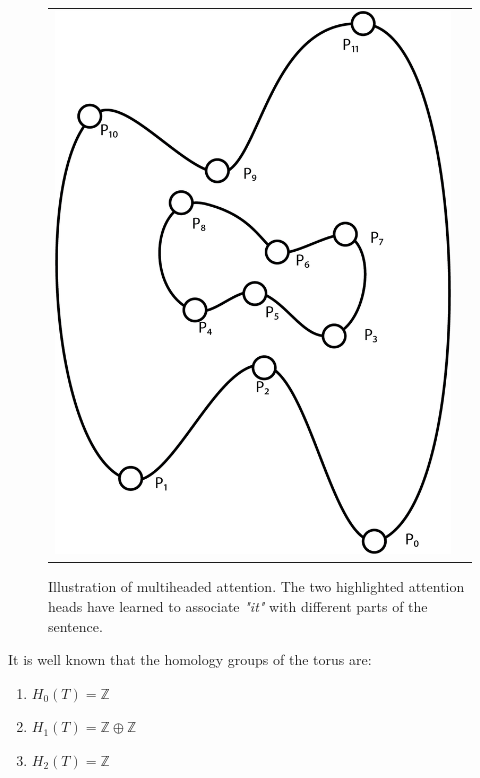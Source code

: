 \documentclass[a4paper]{article}
\theoremstyle{theorem}
\theoremstyle{definition}
\theoremstyle{remark}
\theoremstyle{gremark}
\theoremstyle{discussion}
\theoremstyle{notation}
\begin{document}
	\begin{figure}
	\vspace{-1.75\baselineskip}
	\begin{tabularx}{\linewidth}{@{} cX @{}}
		\includegraphics[scale=0.41,valign=T]{example_figure_1.png}
		&
		\caption[Illustration of multiheaded attention]
		{Illustration of multiheaded attention. The two highlighted attention heads have learned to associate \textit{"it"} with different parts of the sentence.}
		\label{fig:transformer3}
	\end{tabularx}
\end{figure}



It is well known that the homology groups of the torus are:
\begin{enumerate}
	\item $H_0(T)=\mathbb{Z}$
	\item $H_1(T)=\mathbb{Z}\oplus\mathbb{Z}$
	\item $H_2(T)=\mathbb{Z}$
\end{enumerate}
\end{document}
